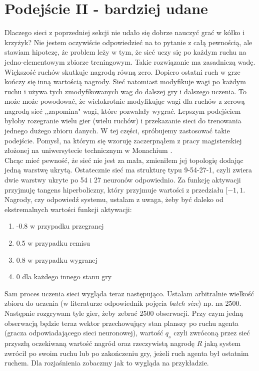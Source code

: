 \documentclass[licencjacka]{pracamgr}
\begin{document}
\section{Podejście II - bardziej udane}

Dlaczego sieci z poprzedniej sekcji nie udało się dobrze nauczyć grać w kółko i krzyżyk? Nie jestem oczywiście odpowiedzieć na to pytanie z całą pewnością, ale stawiam hipotezę, że problem leży w tym, że sieć uczy się po każdym ruchu na jedno-elementowym zbiorze treningowym. Takie rozwiązanie ma zasadniczą wadę. Większość ruchów skutkuje nagrodą równą zero. Dopiero ostatni ruch w grze kończy się inną wartością nagrody. Sieć natomiast modyfikuje wagi po każdym ruchu i używa tych zmodyfikowanych wag do dalszej gry i dalszego uczenia.  To może może powodować, że wielokrotnie modyfikując wagi dla ruchów z zerową nagrodą sieć ,,zapomina" wagi, które pozwalały wygrać. Lepszym podejściem byłoby rozegranie wielu gier (wielu ruchów) i przekazanie sieci do trenowania jednego dużego zbioru danych. W tej części, spróbujemy zastosować takie podejście. Pomysł, na którym się wzoruję  zaczerpnąłem z pracy magisterskiej złożonej na uniwersytecie technicznym w Monachium \cite{TUM}.\\

Chcąc mieć pewność, że sieć nie jest za mała, zmieniłem jej topologię dodając jedną warstwę ukrytą. Ostatecznie sieć ma strukturę typu 9-54-27-1, czyli zwiera dwie warstwy ukryte po 54 i 27 neuronów odpowiednio.  Za funkcję aktywacji przyjmuję tangens hiperboliczny, który przyjmuje wartości z przedziału $[-1,1$. Nagrody, czy odpowiedź systemu, ustalam z uwaga, żeby być daleko od ekstremalnych wartości funkcji aktywacji:

\begin{enumerate}
	\item{-0.8 w przypadku przegranej}
	\item{0.5 w przypadku remisu }
	\item{0.8 w przypadku wygranej}
	\item{0 dla każdego innego stanu gry}
\end{enumerate}

Sam proces uczenia sieci wygląda teraz następująco. Ustalam arbitralnie wielkość zbioru do uczenia (w literaturze odpowiednik pojęcia \textit{batch size}) np. na 2500. Następnie rozgrywam tyle gier, żeby zebrać 2500 obserwacji. Przy czym jedną obserwacją będzie teraz wektor przechowujący stan planszy po ruchu agenta (gracza odpowiadającego sieci neuronowej), wartość $q_{s}$ czyli zwróconą przez sieć przyszłą oczekiwaną wartość nagród  oraz rzeczywistą nagrodę $R$  jaką system zwrócił po swoim ruchu lub po zakończeniu gry, jeżeli ruch agenta był ostatnim ruchem. Dla rozjaśnienia zobaczmy jak to wygląda na przykładzie.\\
\end{document}
